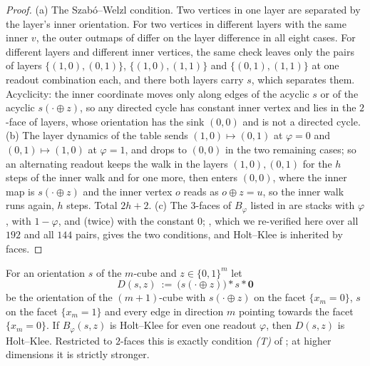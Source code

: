 \begin{proof}
(a) The Szab\'o--Welzl condition. Two vertices in one layer are separated
by the layer's inner orientation. For two vertices in different layers with
the same inner $v$, the outer outmaps of  differ on the
layer difference in all eight cases. For different layers and different
inner vertices, the same check leaves only the pairs of layers
$\{(1,0),(0,1)\}$, $\{(1,0),(1,1)\}$ and $\{(0,1),(1,1)\}$ at one readout
combination each, and there both layers carry $s$, which separates them.
Acyclicity: the inner coordinate moves only along edges of the acyclic
$s$ or of the acyclic $s(\cdot\oplus z)$, so any directed cycle has
constant inner vertex and lies in the $2$-face of layers, whose
orientation has the sink $(0,0)$ and is not a directed cycle.
(b) The layer dynamics of the table sends $(1,0)\mapsto(0,1)$ at
$\varphi=0$ and $(0,1)\mapsto(1,0)$ at $\varphi=1$, and drops to $(0,0)$
in the two remaining cases; so an alternating readout keeps the walk in
the layers $(1,0),(0,1)$ for the $h$ steps of the inner walk and for one
more, then enters $(0,0)$, where the inner map is $s(\cdot\oplus z)$ and
the inner vertex $o$ reads as $o\oplus z=u$, so the inner walk runs again,
$h$ steps. Total $2h+2$.
(c) The $3$-faces of $B_\varphi$ listed in  are
stacks with $\varphi$, with $1-\varphi$, and (twice) with the constant
$0$; , which we re-verified here over all $192$ and all
$144$ pairs, gives the two conditions, and Holt--Klee is inherited by
faces.
\end{proof}

\begin{proposition}\label{hkd:tstar}
For an orientation $s$ of the $m$-cube and $z\in\{0,1\}^{m}$ let
\[
  D(s,z)\ :=\ \bigl(s(\cdot\oplus z)\bigr)\!*\!s\!*\!\mathbf 0
\]
be the orientation of the $(m+1)$-cube with $s(\cdot\oplus z)$ on the
facet $\{x_m=0\}$, $s$ on the facet $\{x_m=1\}$ and every edge in
direction $m$ pointing towards the facet $\{x_m=0\}$. If $B_\varphi(s,z)$
is Holt--Klee for even one readout $\varphi$, then $D(s,z)$ is Holt--Klee.
Restricted to $2$-faces this is exactly condition \emph{(T)} of
; at higher dimensions it is strictly stronger.
\end{proposition}

